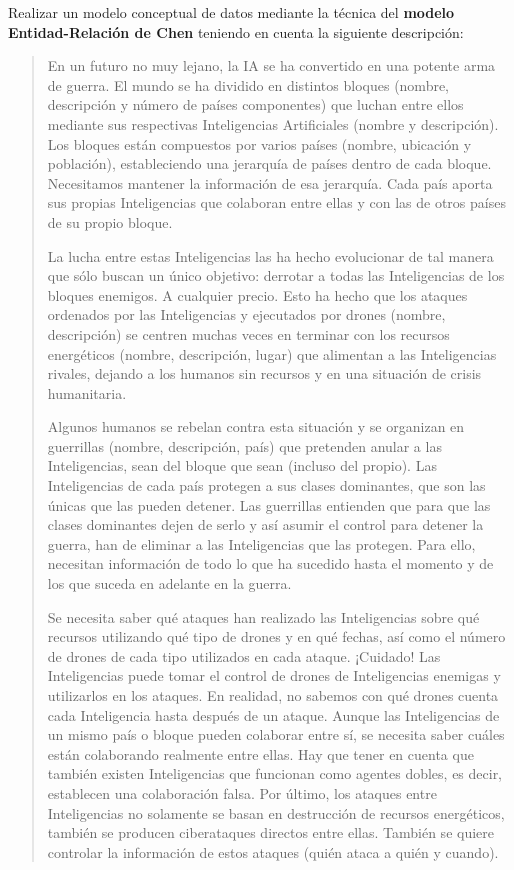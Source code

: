 \documentclass[
    12pt,
    a4paper,
    addpoints,
    answers,
    convocatoria=ord,
    titulacion=NoCD,
    curso=2022/2023,
]{db-exam}
\begin{document}
\begin{questions}

  
Realizar un modelo conceptual de datos mediante la técnica del \textbf{modelo Entidad-Relación de Chen} teniendo en cuenta la siguiente descripción:

\begin{quotation}

En un futuro no muy lejano, la IA se ha convertido en una potente arma de guerra. El mundo se ha dividido en distintos bloques (nombre, descripción y número de países componentes) que luchan entre ellos mediante sus respectivas Inteligencias Artificiales (nombre y descripción). Los bloques están compuestos por varios países (nombre, ubicación y población), estableciendo una jerarquía de países dentro de cada bloque. Necesitamos mantener la información de esa jerarquía. Cada país aporta sus propias Inteligencias que colaboran entre ellas y con las de otros países de su propio bloque. 

La lucha entre estas Inteligencias las ha hecho evolucionar de tal manera que sólo buscan un único objetivo: derrotar a todas las Inteligencias de los bloques enemigos. A cualquier precio. Esto ha hecho que los ataques ordenados por las Inteligencias y ejecutados por drones (nombre, descripción) se centren muchas veces en terminar con los recursos energéticos (nombre, descripción, lugar) que alimentan a las Inteligencias rivales, dejando a los humanos sin recursos y en una situación de crisis humanitaria. 

Algunos humanos se rebelan contra esta situación y se organizan en guerrillas (nombre, descripción, país) que pretenden anular a las Inteligencias, sean del bloque que sean (incluso del propio). Las Inteligencias de cada país protegen a sus clases dominantes, que son las únicas que las pueden detener. Las guerrillas entienden que para que las clases dominantes dejen de serlo y así asumir el control para detener la guerra, han de eliminar a las Inteligencias que las protegen. Para ello, necesitan información de todo lo que ha sucedido hasta el momento y de los que suceda en adelante en la guerra. 

Se necesita saber qué ataques han realizado las Inteligencias sobre qué recursos utilizando qué tipo de drones y en qué fechas, así como el número de drones de cada tipo utilizados en cada ataque. ¡Cuidado! Las Inteligencias puede tomar el control de drones de Inteligencias enemigas y utilizarlos en los ataques. En realidad, no sabemos con qué drones cuenta cada Inteligencia hasta después de un ataque. Aunque las Inteligencias de un mismo país o bloque pueden colaborar entre sí, se necesita saber cuáles están colaborando realmente entre ellas. Hay que tener en cuenta que también existen Inteligencias que funcionan como agentes dobles, es decir, establecen una colaboración falsa. Por último, los ataques entre Inteligencias no solamente se basan en destrucción de recursos energéticos, también se producen ciberataques directos entre ellas. También se quiere controlar la información de estos ataques (quién ataca a quién y cuando).
 

\end{quotation}
\end{questions}
\end{document}
